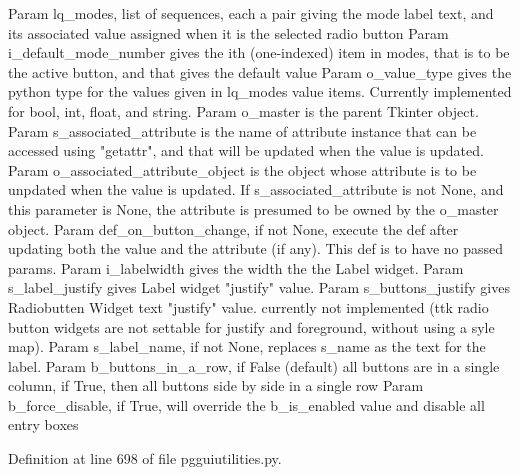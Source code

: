 \begin{DoxyVerb}Param lq_modes, list of sequences, each a pair
    giving the mode label text, and its associated value
    assigned when it is the selected radio button
Param i_default_mode_number gives the ith (one-indexed)
    item in modes, that is to be the active button,
    and that gives the default value
Param o_value_type gives the python type for the values
    given in lq_modes value items.  Currently implemented
    for bool, int, float, and string.
Param o_master is the parent Tkinter object.
Param s_associated_attribute is the name of 
    attribute instance that can be accessed
    using "getattr", and that will be
    updated when the value is updated.
Param o_associated_attribute_object is the object whose attribute
    is to be unpdated when the value is updated.  If
    s_associated_attribute is not None, and this parameter
    is None, the attribute is presumed to be
    owned by the o_master object.
Param def_on_button_change, if not None, execute the def
    after updating both the value and the attribute (if any).
    This def is to have no passed params.
Param i_labelwidth gives the width the the Label widget.
Param s_label_justify gives Label widget "justify" value.
Param s_buttons_justify gives Radiobutten Widget text "justify" value.
currently not implemented (ttk radio button widgets are not
settable for justify and foreground, without using a syle map).
Param s_label_name, if not None, replaces s_name as the text for the label.
Param b_buttons_in_a_row, if False (default) all buttons are in a single column, if True,
then all buttons side by side in a single row
Param b_force_disable, if True, will override the b_is_enabled value and disable all entry 
      boxes
\end{DoxyVerb}
 

Definition at line 698 of file pgguiutilities.\+py.


